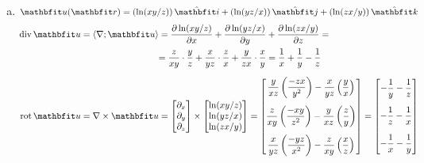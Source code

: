 \documentclass{szb-solution}
\begin{document}
\begin{enumerate}[a)]
  \item $\rvec u(\coordvec) = \ijk{\ln(xy / z)}{\ln(yz / x)}{\ln(zx / y)}$
        \begin{align*}
          \Div \rvec u
           & = \scalar{\nabla}{\rvec u}
          = \pdv{\ln(xy / z)}{x} + \pdv{\ln(yz / x)}{y} + \pdv{\ln(zx / y)}{z}
          =
          \\
           & \phantom{= \scalar{\nabla}{\rvec u}}
          = \frac{z}{xy} \cdot \frac{y}{z} + \frac{x}{yz} \cdot \frac{z}{x} + \frac{y}{zx} \cdot \frac{x}{y}
          = \frac{1}{x} + \frac{1}{y} - \frac{1}{z}
          \\[2mm]
          \rot \rvec u
           & = \nabla \times \rvec u
          = \begin{bmatrix}
              \partial_x \\ \partial_y \\ \partial_z
            \end{bmatrix} \times \begin{bmatrix}
                                   \ln(xy / z) \\ \ln(yz / x) \\ \ln(zx / y)
                                 \end{bmatrix} = \begin{bmatrix}
                                                   \dfrac{y}{xz} \left(\dfrac{-zx}{y^2}\right)
                                                   - \dfrac{x}{yz} \left(\dfrac{y}{x}\right)
                                                   \\[5mm]
                                                   \dfrac{z}{xy} \left(\dfrac{-xy}{z^2}\right)
                                                   - \dfrac{y}{xz} \left(\dfrac{z}{y}\right)
                                                   \\[5mm]
                                                   \dfrac{x}{yz} \left(\dfrac{-yz}{x^2}\right)
                                                   - \dfrac{z}{xy} \left(\dfrac{x}{z}\right)
                                                 \end{bmatrix} =\begin{bmatrix}
                                                                  -\dfrac{1}{y} - \dfrac{1}{z} \\[5mm]
                                                                  -\dfrac{1}{z} - \dfrac{1}{x} \\[5mm]
                                                                  -\dfrac{1}{x} - \dfrac{1}{y}
                                                                \end{bmatrix}
        \end{align*}


\end{enumerate}
\end{document}

